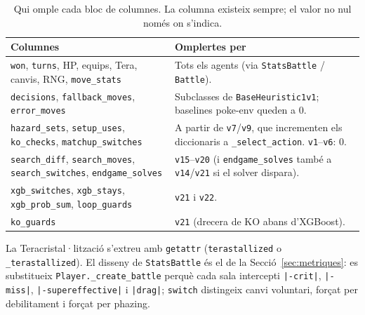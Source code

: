 \begin{table}[htbp]
    \centering
    \caption{Qui omple cada bloc de columnes. La columna existeix sempre; el valor no nul només on s'indica.}
    \label{tab:csv_who}
    \small
    \renewcommand{\arraystretch}{1.15}
    \begin{tabularx}{\textwidth}{lX}
        \toprule
        \textbf{Columnes} & \textbf{Omplertes per} \\
        \midrule
        \texttt{won}, \texttt{turns}, HP, equips, Tera, canvis, RNG, \texttt{move\_stats} & Tots els agents (via \texttt{StatsBattle} / \texttt{Battle}). \\
        \arrayrulecolor{gray!30}\hline\arrayrulecolor{black}
        \texttt{decisions}, \texttt{fallback\_moves}, \texttt{error\_moves} & Subclasses de \texttt{BaseHeuristic1v1}; baselines poke-env queden a 0. \\
        \arrayrulecolor{gray!30}\hline\arrayrulecolor{black}
        \texttt{hazard\_sets}, \texttt{setup\_uses}, \texttt{ko\_checks}, \texttt{matchup\_switches} & A partir de \texttt{v7}/\texttt{v9}, que incrementen els diccionaris a \texttt{\_select\_action}. \texttt{v1}--\texttt{v6}: 0. \\
        \arrayrulecolor{gray!30}\hline\arrayrulecolor{black}
        \texttt{search\_diff}, \texttt{search\_moves}, \texttt{search\_switches}, \texttt{endgame\_solves} & \texttt{v15}--\texttt{v20} (i \texttt{endgame\_solves} també a \texttt{v14}/\texttt{v21} si el solver dispara). \\
        \arrayrulecolor{gray!30}\hline\arrayrulecolor{black}
        \texttt{xgb\_switches}, \texttt{xgb\_stays}, \texttt{xgb\_prob\_sum}, \texttt{loop\_guards} & \texttt{v21} i \texttt{v22}. \\
        \arrayrulecolor{gray!30}\hline\arrayrulecolor{black}
        \texttt{ko\_guards} & \texttt{v21} (drecera de KO abans d'XGBoost). \\
        \bottomrule
    \end{tabularx}
\end{table}

La Teracristal·lització s'extreu amb \texttt{getattr} (\texttt{terastallized} o \texttt{\_terastallized}). El disseny de \texttt{StatsBattle} és el de la Secció~\ref{sec:metriques}: es substitueix \texttt{Player.\_create\_battle} perquè cada sala intercepti \texttt{|-crit|}, \texttt{|-miss|}, \texttt{|-supereffective|} i \texttt{|drag|}; \texttt{switch} distingeix canvi voluntari, forçat per debilitament i forçat per phazing.

